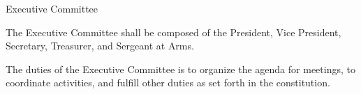 {
	\begin{article}{Executive Committee}
		\item The Executive Committee shall be composed of the President, Vice President, Secretary, Treasurer, and Sergeant at Arms.
		\item The duties of the Executive Committee is to organize the agenda for meetings, to coordinate activities, and fulfill other duties as set forth in the constitution.
	\end{article}
}